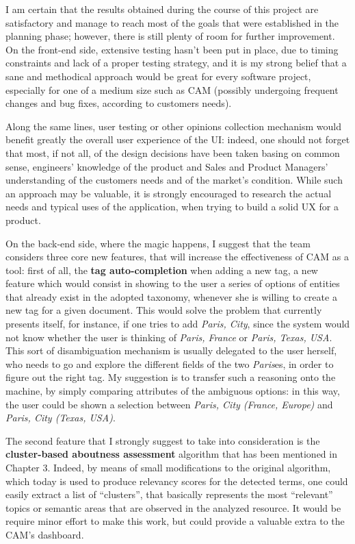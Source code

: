 \documentclass[12pt,oneside,svgnames]{memoir}
\begin{document}
I am certain that the results obtained during the course of this project
are satisfactory and manage to reach most of the goals that were
established in the planning phase; however, there is still plenty of
room for further improvement. On the front-end side, extensive testing
hasn't been put in place, due to timing constraints and lack of a proper
testing strategy, and it is my strong belief that a sane and methodical
approach would be great for every software project, especially for one
of a medium size such as CAM (possibly undergoing frequent changes and
bug fixes, according to customers needs).

Along the same lines, user testing or other opinions collection
mechanism would benefit greatly the overall user experience of the UI:
indeed, one should not forget that most, if not all, of the design
decisions have been taken basing on common sense, engineers' knowledge
of the product and Sales and Product Managers' understanding of the
customers needs and of the market's condition. While such an approach
may be valuable, it is strongly encouraged to research the actual needs
and typical uses of the application, when trying to build a solid UX for
a product.

On the back-end side, where the magic happens, I suggest that the team
considers three core new features, that will increase the effectiveness
of CAM as a tool: first of all, the \textbf{tag auto-completion} when
adding a new tag, a new feature which would consist in showing to the
user a series of options of entities that already exist in the adopted
taxonomy, whenever she is willing to create a new tag for a given
document. This would solve the problem that currently presents itself,
for instance, if one tries to add \emph{Paris, City}, since the system
would not know whether the user is thinking of \emph{Paris, France} or
\emph{Paris, Texas, USA}. This sort of disambiguation mechanism is
usually delegated to the user herself, who needs to go and explore the
different fields of the two \emph{Paris}es, in order to figure out the
right tag. My suggestion is to transfer such a reasoning onto the
machine, by simply comparing attributes of the ambiguous options: in
this way, the user could be shown a selection between \emph{Paris, City
(France, Europe)} and \emph{Paris, City (Texas, USA)}.

The second feature that I strongly suggest to take into consideration is
the \textbf{cluster-based aboutness assessment} algorithm that has been
mentioned in Chapter 3. Indeed, by means of small modifications to the
original algorithm, which today is used to produce relevancy scores for
the detected terms, one could easily extract a list of ``clusters'',
that basically represents the most ``relevant'' topics or semantic areas
that are observed in the analyzed resource. It would be require minor
effort to make this work, but could provide a valuable extra to the
CAM's dashboard.
\end{document}
